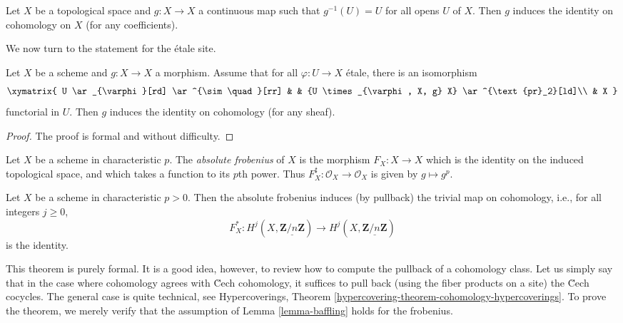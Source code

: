 \begin{exercise}
\label{exercise-baffling}
Let $X$ be a topological space and $g : X \to X$ a continuous map such that
$g^{-1}(U) = U$ for all opens $U$ of $X$. Then $g$ induces the identity on
cohomology on $X$ (for any coefficients).
\end{exercise}

\noindent
We now turn to the statement for the \'etale site.

\begin{lemma}
\label{lemma-baffling}
Let $X$ be a scheme and $g : X \to X$ a morphism. Assume that for all $\varphi:
U \to X$ \'etale, there is an isomorphism
$$
\xymatrix{
U \ar_{\varphi}[rd] \ar^{\sim \quad}[rr] & & {U
\times_{\varphi, X, g} X} \ar^{\text{pr}_2}[ld]\\
& X
}
$$
functorial in $U$. Then $g$ induces the identity on cohomology (for any sheaf).
\end{lemma}

\begin{proof}
The proof is formal and without difficulty.
\end{proof}

\begin{definition}
\label{definition-absolute-frobenius}
Let $X$ be a scheme in characteristic $p$.
The {\it absolute frobenius} of $X$ is the morphism $F_X : X \to X$ which
is the identity on the induced topological space, and which takes a function
to its $p$th power. Thus $F_X^\sharp : \mathcal{O}_X \to \mathcal{O}_X$
is given by $g \mapsto g^p$.
\end{definition}

\begin{theorem}
\label{theorem-baffling}
Let $X$ be a scheme in characteristic $p>0$. Then the absolute frobenius
induces (by pullback) the trivial map on cohomology, i.e., for all
integers $j\geq 0$,
$$
F_X^* : H^j (X, \underline{\mathbf{Z}/n\mathbf{Z}}) \longrightarrow H^j (X,
\underline{\mathbf{Z}/n\mathbf{Z}})
$$
is the identity.
\end{theorem}

\noindent
This theorem is purely formal. It is a good idea, however, to review how to
compute the pullback of a cohomology class. Let us simply say that in the case
where cohomology agrees with \u Cech cohomology, it suffices to pull back
(using the fiber products on a site) the \u Cech cocycles. The general case is
quite technical, see
Hypercoverings, Theorem \ref{hypercovering-theorem-cohomology-hypercoverings}.
To prove the theorem, we merely
verify that the assumption of Lemma \ref{lemma-baffling}
holds for the frobenius.

